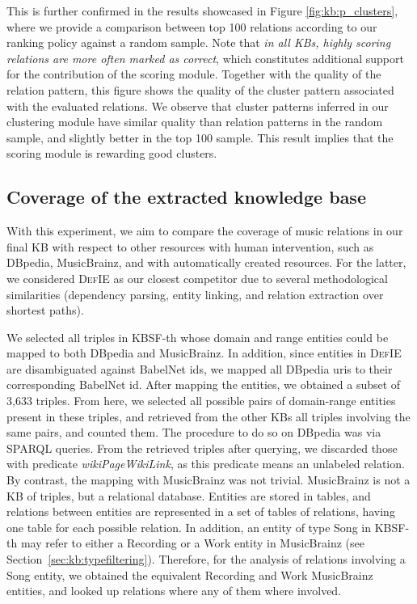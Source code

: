 This is further confirmed in the results showcased in Figure \ref{fig:kb:p_clusters}, where we provide a comparison between top 100 relations according to our ranking policy against a random sample. Note that \textit{in all KBs, highly scoring relations are more often marked as correct}, which constitutes additional support for the contribution of the scoring module. Together with the quality of the relation pattern, this figure shows the quality of the cluster pattern associated with the evaluated relations. We observe that cluster patterns inferred in our clustering module have similar quality than relation patterns in the random sample, and slightly better in the top 100 sample. This result implies that the scoring module is rewarding good clusters.

\subsection{Coverage of the extracted knowledge base}
\label{sec:kb:experiments:coverage}

With this experiment, we aim to compare the coverage of music relations in our final KB with respect to other resources with human intervention, such as DBpedia, MusicBrainz, and with automatically created resources. For the latter, we considered \textsc{DefIE} \citep{DelliBovietal2015b} as our closest competitor due to several methodological similarities (dependency parsing, entity linking, and relation extraction over shortest paths). 

We selected all triples in \textsc{KBSF}-th whose domain and range entities could be mapped to both DBpedia and MusicBrainz. %
In addition, since entities in \textsc{DefIE} are disambiguated against BabelNet ids, we mapped all DBpedia uris to their corresponding BabelNet id. After mapping the entities, we obtained a subset of 3,633 triples. From here, we selected all possible pairs of domain-range entities present in these triples, and retrieved from the other KBs all triples involving the same pairs, and counted them.
The procedure to do so on DBpedia was via SPARQL queries.
From the retrieved triples after querying, we discarded those with predicate \textit{wikiPageWikiLink}, as this predicate means an unlabeled relation. By contrast, the mapping with MusicBrainz was not trivial. MusicBrainz is not a KB of triples, but a relational database. Entities are stored in tables, and relations between entities are represented in a set of tables of relations, having one table for each possible relation. %
In addition, an entity of type Song in \textsc{KBSF}-th may refer to either a Recording or a Work entity in MusicBrainz (see Section~\ref{sec:kb:typefiltering}). Therefore, for the analysis of relations involving a Song entity, we obtained the equivalent Recording and Work MusicBrainz entities, and looked up relations where any of them where involved.

